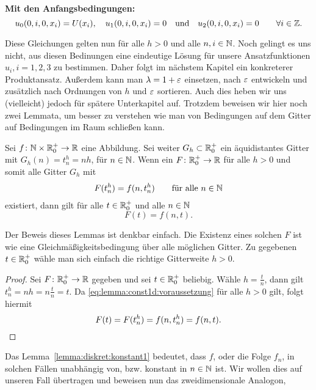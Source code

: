 \vspace{0.4cm}
\noindent \textbf{Mit den Anfangsbedingungen:}
\[ u_0(0, i, 0, x_i) = U(x_i), \quad u_1(0, i, 0, x_i) = 0 \quad \text{und} \quad u_2(0, i, 0, x_i) = 0 \qquad \forall i \in \mathbb Z. \]

Diese Gleichungen gelten nun für alle $h > 0$ und alle $n, i \in \mathbb N$.
Noch gelingt es uns nicht, aus diesen Bedinungen eine eindeutige Lösung für unsere Ansatzfunktionen $u_i, i=1,2,3$ zu bestimmen.
Daher folgt im nächstem Kapitel ein konkreterer Produktansatz.
Außerdem kann man $\lambda = 1 + \varepsilon$ einsetzen, nach $\varepsilon$ entwickeln und zusätzlich nach Ordnungen von $h$ und $\varepsilon$ sortieren.
Auch dies heben wir uns (vielleicht) jedoch für spätere Unterkapitel auf.
Trotzdem beweisen wir hier noch zwei Lemmata, um besser zu verstehen wie man von Bedingungen auf dem Gitter auf Bedingungen im Raum schließen kann.

\begin{lemma} \label{lemma:diskret:konstant1}
Sei $f\colon \mathbb N \times \mathbb R^+_0 \to \mathbb R$ eine Abbildung.
Sei weiter $G_h \subset \mathbb R^+_0$ ein äquidistantes Gitter mit $G_h(n) = t^h_n = n h$, für $n \in \mathbb N$.
Wenn ein $F\colon \mathbb R^+_0 \to \mathbb R$ für alle $h > 0$ und somit alle Gitter $G_h$ mit
\begin{align}\label{eq:lemma:const1d:voraussetzung}
F(t^h_n) = f(n, t^h_n) \qquad \text{für alle $n \in \mathbb N$}
\end{align}
existiert, dann gilt für alle $t \in \mathbb R^+_0$ und alle $n \in \mathbb N$
\[ F(t) = f(n, t). \]
\end{lemma}
Der Beweis dieses Lemmas ist denkbar einfach. Die Existenz eines solchen $F$ ist wie eine Gleichmäßigkeitsbedingung über alle möglichen Gitter.
Zu gegebenen $t \in \mathbb R^+_0$ wähle man sich einfach die richtige Gitterweite $h > 0$.
\begin{proof}
Sei $F\colon \mathbb R^+_0 \to \mathbb R$ gegeben und sei $t \in \mathbb R^+_0$ beliebig.
Wähle $h = \frac{t}{n}$, dann gilt $t^h_n = nh = n \frac{t}{n} = t$.
Da \eqref{eq:lemma:const1d:voraussetzung} für alle $h > 0$ gilt, folgt hiermit 
\[ F(t) = F(t^h_n) = f(n, t^h_n) = f(n, t). \qedhere \]
\end{proof}

Das Lemma~\ref{lemma:diskret:konstant1} bedeutet, dass $f$, oder die Folge $f_n$, in solchen Fällen unabhängig von, bzw. konstant in $n \in \mathbb N$ ist.
Wir wollen dies auf unseren Fall übertragen und beweisen nun das zweidimensionale Analogon, 

